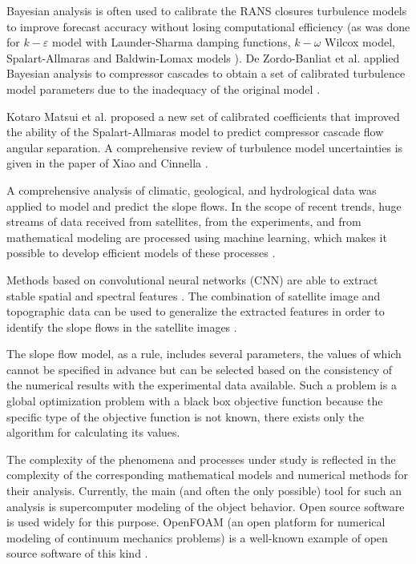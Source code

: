 \documentclass[mathematics,article,submit,pdftex,moreauthors]{Definitions/mdpi}
\begin{document}
Bayesian analysis is often used to calibrate the RANS closures turbulence models to improve forecast accuracy without losing computational efficiency (as was done for $k-\varepsilon$ model with Launder-Sharma damping functions, $k-\omega$ Wilcox model, Spalart-Allmaras and Baldwin-Lomax models \cite{Edeling2014a,Edeling2014b}). De Zordo-Banliat et al. applied Bayesian analysis to compressor cascades to obtain a set of calibrated turbulence model parameters due to the inadequacy of the original model \cite{deZordoBanliat2020}.

Kotaro Matsui et al. \cite{Matsui2021} proposed a new set of calibrated coefficients that improved the ability of the Spalart-Allmaras model to predict compressor cascade flow angular separation. A comprehensive review of turbulence model uncertainties is given in the paper of Xiao and Cinnella \cite{Xiao2019}.


A comprehensive analysis of climatic, geological, and hydrological data was applied to model and predict the slope flows. In the scope of recent trends, huge streams of data received from satellites, from the experiments, and from mathematical modeling are processed using machine learning, which makes it possible to develop efficient models of these processes \cite{GeoML, Ma2020}.

Methods based on convolutional neural networks (CNN) are able to extract stable spatial and spectral features \cite{Maggiori2017}. The combination of satellite image and topographic data can be used to generalize the extracted features in order to identify the slope flows in the satellite images \cite{Qin2021, Prakash2021}.

The slope flow model, as a rule, includes several parameters, the values of which cannot be specified in advance but can be selected based on the consistency of the numerical results with the experimental data available. Such a problem is a global optimization problem with a black box objective function because the specific type of the objective function is not known, there exists only the algorithm for calculating its values.

The complexity of the phenomena and processes under study is reflected in the complexity of the corresponding mathematical models and numerical methods for their analysis. Currently, the main (and often the only possible) tool for such an analysis is supercomputer modeling of the object behavior. Open source software is used widely for this purpose. OpenFOAM (an open platform for numerical modeling of continuum mechanics problems) is a well-known example of open source software of this kind \cite{Weller1998}. 
\end{document}

